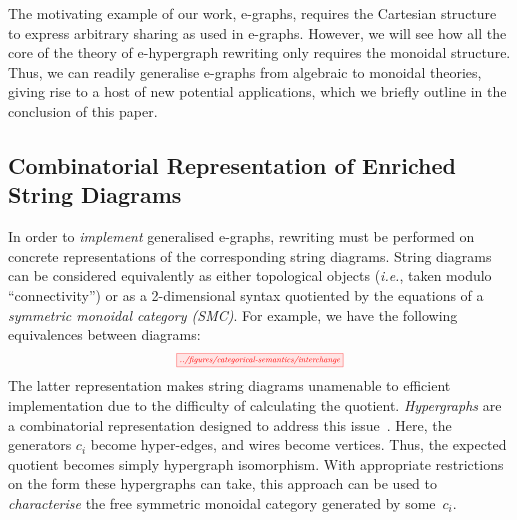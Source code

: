 The motivating example of our work, e-graphs, requires the Cartesian structure to express arbitrary sharing as used in e-graphs.
However, we will see how all the core of the theory of e-hypergraph rewriting only requires the monoidal structure. 
Thus, we can readily generalise e-graphs from algebraic to monoidal theories, giving rise to a  host of new potential applications, which we briefly outline in the conclusion of this paper.   

\subsection{Combinatorial Representation of Enriched String Diagrams}

In order to \textit{implement} generalised e-graphs, rewriting must be performed on concrete representations of the corresponding string diagrams.  
String diagrams can be considered equivalently as either topological objects (\textit{i.e.}, taken modulo ``connectivity'') or as a 2-dimensional syntax quotiented by the equations of a \textit{symmetric monoidal category (SMC)}.
For example, we have the following equivalences between diagrams:
\[
	\scalebox{0.6}{
	\tikzfig{../figures/categorical-semantics/interchange}
	}
\]
The latter representation makes string diagrams unamenable to efficient implementation due to the difficulty of calculating the quotient.
\emph{Hypergraphs} are a combinatorial representation designed to address this issue~\cite{bonchi_string_2022-1,bonchi_string_2022-2,bonchi_string_2022}.
Here, the generators $c_i$ become hyper-edges,  and wires become vertices.  
Thus, the expected quotient becomes simply hypergraph isomorphism. 
With appropriate restrictions on the form these hypergraphs can take, this approach can be used to \textit{characterise} the free symmetric monoidal category generated by some~$c_i$. 

